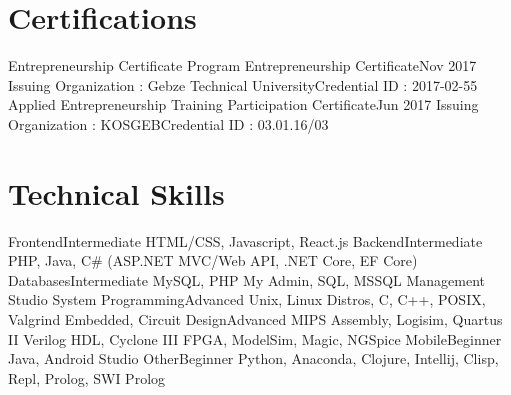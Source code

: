 \documentclass{main} %
\begin{document}
\section{Certifications}
    \resumeSubHeadingListStart
        \resumeSubheading
            {Entrepreneurship Certificate Program Entrepreneurship Certificate}{Nov 2017}
            {Issuing Organization : Gebze Technical University}{Credential ID : 2017-02-55}
        \resumeSubheading
            {Applied Entrepreneurship Training Participation Certificate}{Jun 2017}
            {Issuing Organization : KOSGEB}{Credential ID : 03.01.16/03}
    \resumeSubHeadingListEnd

\section{Technical Skills}
    \resumeSubHeadingListStart %
        \resumeSubheading
            {Frontend}{Intermediate} %
            {HTML/CSS, Javascript, React.js}{}
        \resumeSubheading
            {Backend}{Intermediate} %
            {PHP, Java, C\# (ASP.NET MVC/Web API, .NET Core, EF Core)}{}
        \resumeSubheading
            {Databases}{Intermediate} %
            {MySQL, PHP My Admin, SQL, MSSQL Management Studio}{}
        \resumeSubheading
            {System Programming}{Advanced}
            {Unix, Linux Distros, C, C++, POSIX, Valgrind}{}
        \resumeSubheading
            {Embedded, Circuit Design}{Advanced}
            {MIPS Assembly, Logisim, Quartus II Verilog HDL, Cyclone III FPGA, ModelSim, Magic, NGSpice}{}
        \resumeSubheading
            {Mobile}{Beginner}
            {Java, Android Studio}{}
        \resumeSubheading
            {Other}{Beginner}
            {Python, Anaconda, Clojure, Intellij, Clisp, Repl, Prolog, SWI Prolog}{}
    \resumeSubHeadingListEnd
\end{document}
